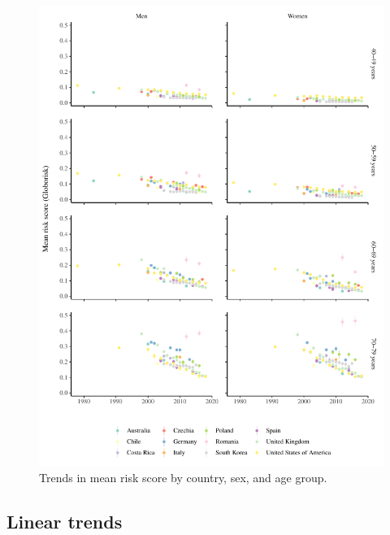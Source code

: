\documentclass[12pt]{article}
\begin{document}
\begin{appendix}
    \begin{figure}[hp]
        \centering
        \includegraphics[width=\textwidth]{../3_figures/figS3_risk_score.pdf}
        \caption{Trends in mean risk score by country, sex, and age group.}
        \label{fig:globorisk}
    \end{figure}
    

    \newpage
    \subsection{Linear trends}


\end{appendix}
\end{document}
